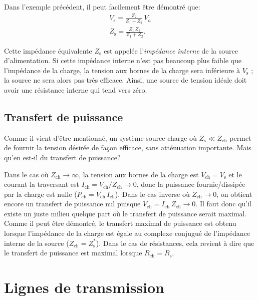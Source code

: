 \documentclass[12pt,oneside,letterpaper]{article}
\begin{document}
Dans l'exemple précédent, il peut facilement être démontré que:
\begin{subequations}
\begin{gather}
V_{\mathrm{s}}=\frac{Z_2}{Z_1+Z_2}\,V_a\\
Z_{\mathrm{s}}=\frac{Z_1\,Z_2}{Z_1+Z_2}.
\end{gather}
\end{subequations}

Cette impédance équivalente $Z_{\mathrm{s}}$ est appelée l'\textit{impédance interne} de la source d'alimentation. Si cette impédance interne n'est pas beaucoup plus faible que l'impédance de la charge, la tension aux bornes de la charge sera inférieure à $V_{\mathrm{s}}$ ; la source ne sera alors pas très efficace. Ainsi, une source de tension idéale doit avoir une résistance interne qui tend vers zéro.


\subsection{Transfert de puissance}

Comme il vient d'être mentionné, un système source-charge où $Z_{\mathrm{s}}\ll Z_{\mathrm{ch}}$ permet de fournir la tension désirée de façon efficace, sans atténuation importante. Mais qu'en est-il du transfert de puissance?

Dans le cas où $Z_{\mathrm{ch}}\rightarrow\infty$, la tension aux bornes de la charge est $V_{\mathrm{ch}}=V_{\mathrm{s}}$ et le courant la traversant est $I_{\mathrm{ch}}=V_{\mathrm{ch}}/Z_{\mathrm{ch}}\rightarrow0$, donc la puissance fournie/dissipée par la charge est nulle ($P_{\mathrm{ch}}=V_{\mathrm{ch}}\,I_{\mathrm{ch}}$). Dans le cas inverse où $Z_{\mathrm{ch}}\rightarrow0$, on obtient encore un transfert de puissance nul puisque $V_{\mathrm{ch}}=I_{\mathrm{ch}}\,Z_{\mathrm{ch}}\rightarrow0$. Il faut donc qu'il existe un juste milieu quelque part où le transfert de puissance serait maximal. Comme il peut être démontré, le transfert maximal de puissance est obtenu lorsque l'impédance de la charge est égale au complexe conjugué de l'impédance interne de la source ($Z_{\mathrm{ch}}=Z^*_{\mathrm{s}}$). Dans le cas de résistances, cela revient à dire que le transfert de puissance est maximal lorsque $R_{\mathrm{ch}}=R_{\mathrm{s}}$.


\section{Lignes de transmission}
\end{document}
